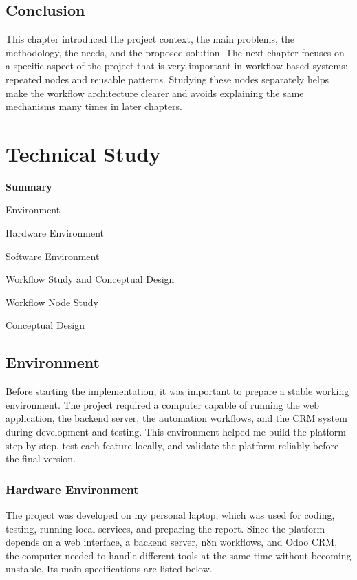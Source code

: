 \documentclass[12pt,a4paper,oneside]{report}
\newcommand{\chsummaryitem}[3]{\noindent\makebox[1.15cm][l]{#1}#2\,\dotfill\,\pageref{#3}\par}
\newcommand{\chsummarysub}[3]{\noindent\hspace*{1.0cm}\makebox[1.4cm][l]{#1}#2\,\dotfill\,\pageref{#3}\par}
\begin{document}
\section{Conclusion}\label{sumlbl:c1s8}
This chapter introduced the project context, the main problems, the methodology, the needs, and the proposed solution. The next chapter focuses on a specific aspect of the project that is very important in workflow-based systems: repeated nodes and reusable patterns. Studying these nodes separately helps make the workflow architecture clearer and avoids explaining the same mechanisms many times in later chapters.


\chapter{Technical Study}

\vspace{0.35cm}
{\Large\bfseries Summary}\par
{}\vspace{0.30cm}
{\small
\chsummaryitem{2.1}{Environment}{sumlbl:c2s1}
\chsummarysub{2.1.1}{Hardware Environment}{sumlbl:c2s1ss1}
\chsummarysub{2.1.2}{Software Environment}{sumlbl:c2s1ss2}
\chsummaryitem{2.2}{Workflow Study and Conceptual Design}{sumlbl:c2s2}
\chsummarysub{2.2.1}{Workflow Node Study}{sumlbl:c2s2ss1}
\chsummarysub{2.2.2}{Conceptual Design}{sumlbl:c2s2ss2}
}
\clearpage




\section{Environment}\label{sumlbl:c2s1}

Before starting the implementation, it was important to prepare a stable working environment. The project required a computer capable of running the web application, the backend server, the automation workflows, and the CRM system during development and testing. This environment helped me build the platform step by step, test each feature locally, and validate the platform reliably before the final version.

\subsection{Hardware Environment}\label{sumlbl:c2s1ss1}

The project was developed on my personal laptop, which was used for coding, testing, running local services, and preparing the report. Since the platform depends on a web interface, a backend server, n8n workflows, and Odoo CRM, the computer needed to handle different tools at the same time without becoming unstable. Its main specifications are listed below.
\end{document}
